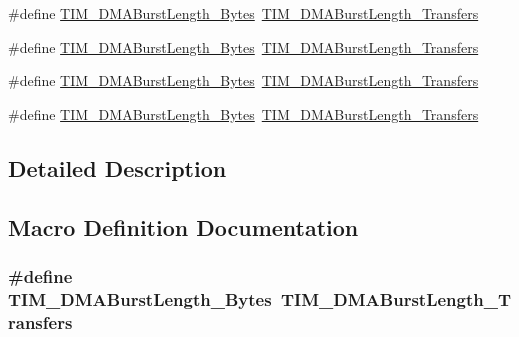 \begin{DoxyCompactItemize}
\#define \hyperlink{group___t_i_m___legacy_ga3ca90d9fa3c80590175ba42baac57098}{T\+I\+M\+\_\+\+D\+M\+A\+Burst\+Length\+\_\+Bytes}~\hyperlink{group___t_i_m___d_m_a___burst___length_gad13373f5fd246557a4fc487dc43c37ec}{T\+I\+M\+\_\+\+D\+M\+A\+Burst\+Length\+\_\+Transfers}
\item 
\#define \hyperlink{group___t_i_m___legacy_ga672117a7dafcd778fe8e86db423b07e9}{T\+I\+M\+\_\+\+D\+M\+A\+Burst\+Length\+\_\+Bytes}~\hyperlink{group___t_i_m___d_m_a___burst___length_gafb644e6033f7b46c602b02754b69fde0}{T\+I\+M\+\_\+\+D\+M\+A\+Burst\+Length\+\_\+Transfers}
\item 
\#define \hyperlink{group___t_i_m___legacy_gacffd0dc1f04aa06624a4980dcae6eede}{T\+I\+M\+\_\+\+D\+M\+A\+Burst\+Length\+\_\+Bytes}~\hyperlink{group___t_i_m___d_m_a___burst___length_ga5b2c97f650a3c1726965187d852b8cc5}{T\+I\+M\+\_\+\+D\+M\+A\+Burst\+Length\+\_\+Transfers}
\item 
\#define \hyperlink{group___t_i_m___legacy_ga9c4d457417b1ba72ed0ae9886a75547a}{T\+I\+M\+\_\+\+D\+M\+A\+Burst\+Length\+\_\+Bytes}~\hyperlink{group___t_i_m___d_m_a___burst___length_gaed9f2afef174079f6eb6927abd995b9b}{T\+I\+M\+\_\+\+D\+M\+A\+Burst\+Length\+\_\+Transfers}
\end{DoxyCompactItemize}


\subsection{Detailed Description}


\subsection{Macro Definition Documentation}
\subsubsection[{\texorpdfstring{T\+I\+M\+\_\+\+D\+M\+A\+Burst\+Length\+\_\+10\+Bytes}{TIM_DMABurstLength_10Bytes}}]{\setlength{\rightskip}{0pt plus 5cm}\#define T\+I\+M\+\_\+\+D\+M\+A\+Burst\+Length\+\_\+Bytes~{\bf T\+I\+M\+\_\+\+D\+M\+A\+Burst\+Length\+\_\+Transfers}}\hypertarget{group___t_i_m___legacy_ga99141ca3210700d07d098d161b42cdf3}{}\label{group___t_i_m___legacy_ga99141ca3210700d07d098d161b42cdf3}



